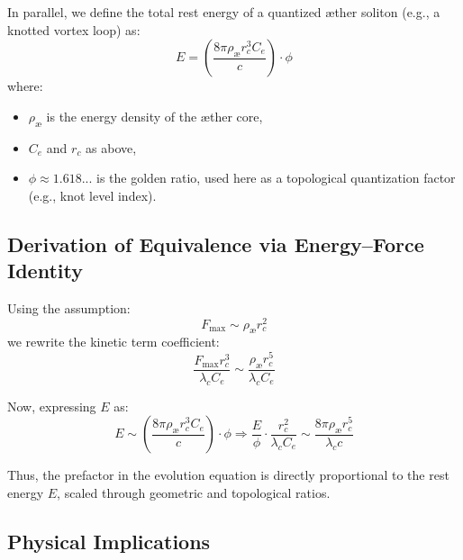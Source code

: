             In parallel, we define the total rest energy of a quantized æther soliton (e.g., a knotted vortex loop) as:
            \begin{equation}
            E = \left( \frac{8\pi \rho_{\text{æ}} r_c^3 C_e}{c} \right) \cdot \phi
            \end{equation}
            where:
            \begin{itemize}
              \item $\rho_{\text{æ}}$ is the energy density of the æther core,
              \item $C_e$ and $r_c$ as above,
              \item $\phi \approx 1.618...$ is the golden ratio, used here as a topological quantization factor (e.g., knot level index).
            \end{itemize}

            \subsection{Derivation of Equivalence via Energy–Force Identity}

            Using the assumption:
            \begin{equation}
            F_{\max} \sim \rho_{\text{æ}} r_c^2
            \end{equation}
            we rewrite the kinetic term coefficient:
            \begin{equation}
            \frac{F_{\max} r_c^3}{\lambda_c C_e} \sim \frac{\rho_{\text{æ}} r_c^5}{\lambda_c C_e}
            \end{equation}

            Now, expressing $E$ as:
            \begin{equation}
            E \sim \left( \frac{8\pi \rho_{\text{æ}} r_c^3 C_e}{c} \right) \cdot \phi
            \Rightarrow
            \frac{E}{\phi} \cdot \frac{r_c^2}{\lambda_c C_e} \sim \frac{8\pi \rho_{\text{æ}} r_c^5}{\lambda_c c}
            \end{equation}

            Thus, the prefactor in the evolution equation is directly proportional to the rest energy $E$, scaled through geometric and topological ratios.

            \subsection{Physical Implications}

